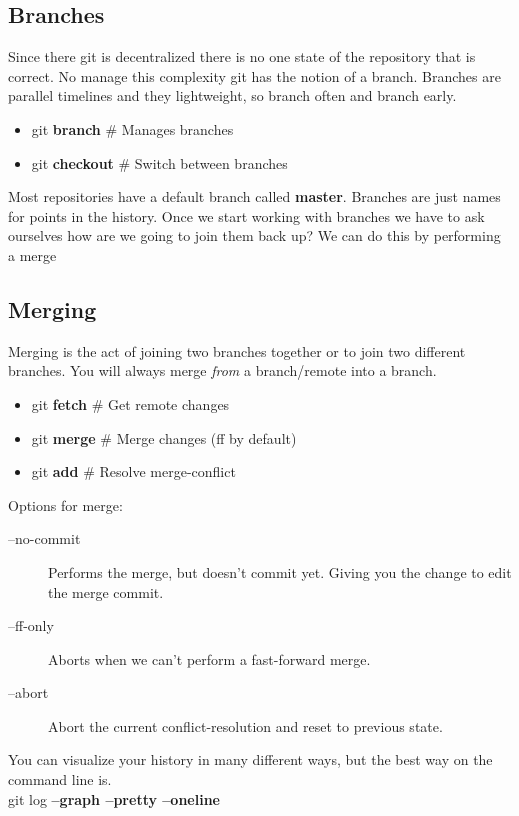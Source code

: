 \documentclass{beamer}
\begin{document}
\subsection{Branches}
\begin{frame}[fragile]
  Since there git is decentralized there is no one state of the repository that is correct. No manage this complexity git has the notion of a branch. Branches are parallel timelines and they lightweight, so branch often and branch early.
  \begin{block}{}
    \begin{itemize}
      \item git \textbf{branch}   # Manages branches 
      \item git \textbf{checkout} # Switch between branches
    \end{itemize}
  \end{block}
  Most repositories have a default branch called \textbf{master}. Branches are just names for points in the history.
  Once we start working with branches we have to ask ourselves how are we going to join them back up? We can do this by performing a merge
\end{frame}
\subsection{Merging}
Merging is the act of joining two branches together or to join two different branches. You will always merge \emph{from} a branch/remote into a branch.
\begin{frame}[fragile]
  \begin{block}{}
    \begin{itemize}
      \item git \textbf{fetch} # Get remote changes
      \item git \textbf{merge} # Merge changes (ff by default)
      \item git \textbf{add}   # Resolve merge-conflict
    \end{itemize}

    Options for merge:
    \begin{description}
      \item[--no-commit] Performs the merge, but doesn't commit yet. Giving you the change to edit the merge commit.
      \item[--ff-only]   Aborts when we can't perform a fast-forward merge.
      \item[--abort]     Abort the current conflict-resolution and reset to previous state.
    \end{description}
  \end{block}

  You can visualize your history in many different ways, but the best way on the command line is.\\
  git log \textbf{--graph --pretty --oneline}
\end{frame}
\end{document}
